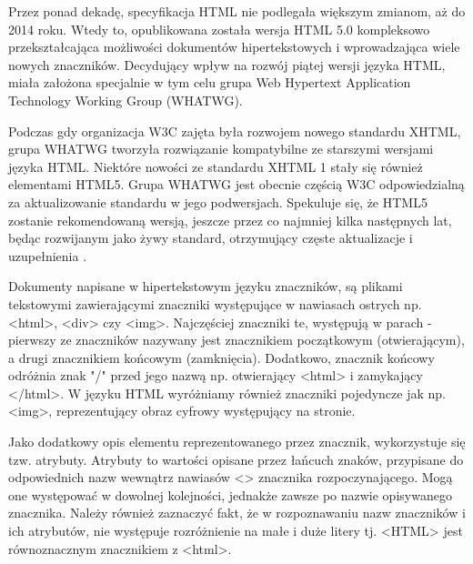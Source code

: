 Przez ponad dekadę, specyfikacja HTML nie podlegała większym zmianom, aż do 2014 roku. Wtedy to, opublikowana została wersja HTML 5.0 kompleksowo przekształcająca możliwości dokumentów hipertekstowych i wprowadzająca wiele nowych znaczników. Decydujący wpływ na rozwój piątej wersji języka HTML, miała założona specjalnie w tym celu grupa Web Hypertext Application Technology Working Group (WHATWG). 

Podczas gdy organizacja W3C zajęta była rozwojem nowego standardu XHTML, grupa WHATWG tworzyła rozwiązanie kompatybilne ze starszymi wersjami języka HTML. Niektóre nowości ze standardu XHTML 1 stały się również elementami HTML5.  Grupa WHATWG jest obecnie częścią W3C odpowiedzialną za aktualizowanie standardu w jego podwersjach. Spekuluje się, że HTML5 zostanie rekomendowaną wersją, jeszcze przez co najmniej kilka następnych lat, będąc rozwijanym jako żywy standard, otrzymujący częste aktualizacje i uzupełnienia \cite{html.whatwg}.

Dokumenty napisane w hipertekstowym języku znaczników, są plikami tekstowymi zawierającymi znaczniki występujące w nawiasach ostrych np. <html>, <div> czy <img>. Najczęściej znaczniki te, występują w parach - pierwszy ze znaczników nazywany jest znacznikiem początkowym (otwierającym), a drugi znacznikiem końcowym (zamknięcia). Dodatkowo, znacznik końcowy odróżnia znak "/" przed jego nazwą np. otwierający <html> i zamykający </html>. W języku HTML wyróżniamy również znaczniki pojedyncze jak np. <img>, reprezentujący obraz cyfrowy występujący na stronie. 

Jako dodatkowy opis elementu reprezentowanego przez znacznik, wykorzystuje się tzw. atrybuty. Atrybuty to wartości opisane przez łańcuch znaków, przypisane do odpowiednich nazw wewnątrz nawiasów <> znacznika rozpoczynającego. Mogą one występować w dowolnej kolejności, jednakże zawsze po nazwie opisywanego znacznika. Należy również zaznaczyć fakt, że w rozpoznawaniu nazw znaczników i ich atrybutów, nie występuje rozróżnienie na małe i duże litery tj. <HTML> jest równoznacznym znacznikiem z <html>.

